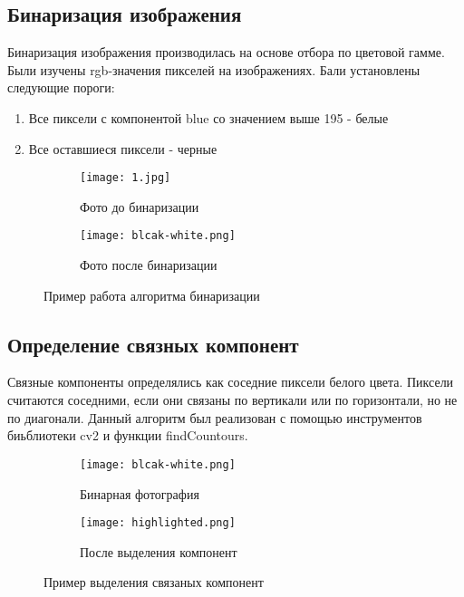 \documentclass{article}
\begin{document}
\subsection{Бинаризация изображения}

Бинаризация изображения производилась на основе отбора по цветовой гамме. Были изучены rgb-значения пикселей на изображениях. Бали установлены следующие пороги:

\begin{enumerate}
    \item Все пиксели с компонентой blue со значением выше 195 - белые
    \item Все оставшиеся пиксели - черные
\end{enumerate}

\begin{figure}[h!]
  \centering
  \begin{subfigure}[b]{0.4\linewidth}
    \texttt{[image: 1.jpg]}
    \caption{Фото до бинаризации}
    \label{fig:sub1}
  \end{subfigure}
  \begin{subfigure}[b]{0.4\linewidth}
    \texttt{[image: blcak-white.png]}
    \caption{Фото после бинаризации}
    \label{fig:sub2}
  \end{subfigure}
  \caption{Пример работа алгоритма бинаризации}
  \label{fig:twophotos}
\end{figure}

\subsection{Определение связных компонент}

Связные компоненты определялись как соседние пиксели белого цвета. Пиксели считаются соседними, если они связаны по вертикали или по горизонтали, но не по диагонали. Данный алгоритм был реализован с помощью инструментов биьблиотеки cv2 и функции findCountours.

\begin{figure}[h!]
  \centering
  \begin{subfigure}[b]{0.4\linewidth}
    \texttt{[image: blcak-white.png]}
    \caption{Бинарная фотография}
    \label{fig:sub1}
  \end{subfigure}
  \begin{subfigure}[b]{0.4\linewidth}
    \texttt{[image: highlighted.png]}
    \caption{После выделения компонент}
    \label{fig:sub2}
  \end{subfigure}
  \caption{Пример выделения связаных компонент}
  \label{fig:twophotos}
\end{figure}
\end{document}
